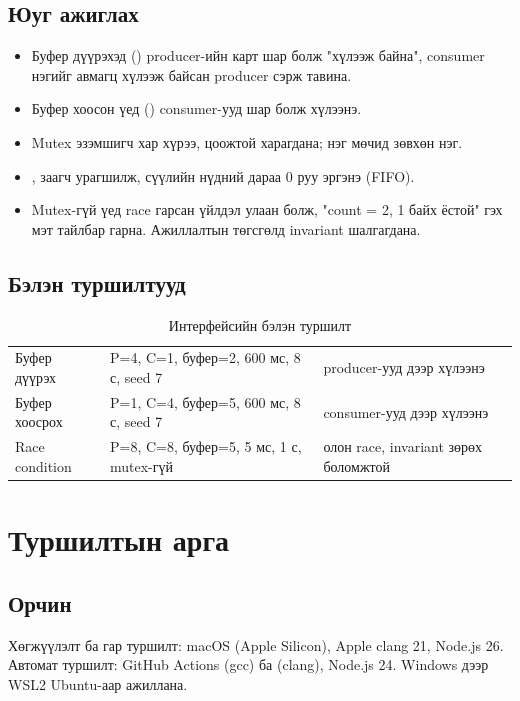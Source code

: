 \documentclass[12pt,a4paper]{article}
\begin{document}
\subsection{Юуг ажиглах}
\begin{itemize}
  \item Буфер дүүрэхэд () producer-ийн карт шар болж "хүлээж байна", consumer нэгийг авмагц хүлээж байсан producer сэрж тавина.
  \item Буфер хоосон үед () consumer-ууд шар болж хүлээнэ.
  \item Mutex эзэмшигч хар хүрээ, цоожтой харагдана; нэг мөчид зөвхөн нэг.
  \item {},  заагч урагшилж, сүүлийн нүдний дараа 0 руу эргэнэ (FIFO).
  \item Mutex-гүй үед race гарсан үйлдэл улаан болж, "count = 2, 1 байх ёстой" гэх мэт тайлбар гарна. Ажиллалтын төгсгөлд invariant шалгагдана.
\end{itemize}

\subsection{Бэлэн туршилтууд}
\begin{table}[H]\centering\small
\caption{Интерфейсийн бэлэн туршилт}\label{tab:scen}
\begin{tabular}{|L{0.22\textwidth}|L{0.38\textwidth}|L{0.4\textwidth}|}\hline
{} &  &  \\\hline
Буфер дүүрэх & P=4, C=1, буфер=2, 600 мс, 8 с, seed 7 & producer-ууд  дээр хүлээнэ \\\hline
Буфер хоосрох & P=1, C=4, буфер=5, 600 мс, 8 с, seed 7 & consumer-ууд  дээр хүлээнэ \\\hline
Race condition & P=8, C=8, буфер=5, 5 мс, 1 с, mutex-гүй & олон race, invariant зөрөх боломжтой \\\hline
\end{tabular}
\end{table}

\section{Туршилтын арга}

\subsection{Орчин}
Хөгжүүлэлт ба гар туршилт: macOS (Apple Silicon), Apple clang 21, Node.js 26. Автомат туршилт: GitHub Actions  (gcc) ба  (clang), Node.js 24. Windows дээр WSL2 Ubuntu-аар ажиллана.
\end{document}
